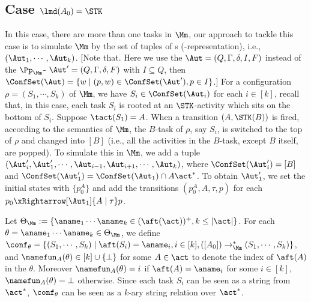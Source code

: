 \subsection{Case $\lmd(A_0)=\STK$}\label{sec:a0stk}
In this case, there are more than one tasks in $\Mm$, our approach to tackle this case is to simulate $\Mm$ by the set of tuples of {\WOTrNFA}s ({\WOTrNFA}-representation), i.e., $(\Aut_1,\cdots,\Aut_k)$.  [Note that. Here we use the {\WOTrNFA} $\Aut = (Q,\Gamma,\delta,I,F)$ instead of the $\Pp_{\Mm}$-{\WOTrNFA} $\Aut'=(Q,\Gamma,\delta,F)$ with $I\subseteq Q$, then $\ConfSet(\Aut) = \{w\mid (p,w)\in\ConfSet(\Aut'),p\in I\}$.] For a configuration $\rho = (S_1,\cdots,S_k)$ of $\Mm$, we have $S_i\in\ConfSet(\Aut_i)$ for each $i\in[k]$, recall that, in this case, each task $S_i$ is rooted at an $\STK$-activity which sits on the bottom of $S_i$. Suppose $\tact(S_1) = A$. When a transition $(A,\STK(B))$ is fired, according to the semantics of $\Mm$, the $B$-task of $\rho$, say $S_i$, is switched to the top of $\rho$ and changed into $[B]$ (i.e., all the activities in the $B$-task, except $B$ itself, are popped). To simulate this in $\Mm$, we add a tuple $(\Aut_i',\Aut_1',\cdots,\Aut_{i-1},\Aut_{i+1},\cdots,\Aut_{k})$, where $\ConfSet(\Aut_i')=[B]$ and $\ConfSet(\Aut_1') = \ConfSet(\Aut_1)\cap A\act^*$. To obtain $\Aut_1'$, we set the initial states with $\{p_0^A\}$ and add the transitions $(p_0^A,A,\tau,p)$ for each $p_0\xRightarrow[\Aut_1]{A\mid\tau}p$. 


Let $\Theta_\Mm:=\{ \aname_1 \cdots \aname_k \in (\aft(\act))^+, k \le |\act|\}$. For each $\theta=\aname_1 \cdots \aname_k \in \Theta_\Mm$, we define $\conf_\theta = \{(S_1, \cdots, S_k) \mid \aft(S_i) =\aname_i, i\in[k],  ([A_0]) \rightarrow_\Mm^* (S_1, \cdots, S_k)\}$, and $\namefun_A(\theta)\in[k]\cup\{\bot\}$ for some $A\in\act$ to denote the index of $\aft(A)$ in the $\theta$. Moreover $\namefun_A(\theta) = i$ if $\aft(A) = \aname_i$ for some $i\in[k]$, $\namefun_A(\theta) = \bot$ otherwise. Since each task $S_i$ can be seen as a string from $\act^*$, $\conf_\theta$ can be seen as a $k$-ary string relation over $\act^*$. 

